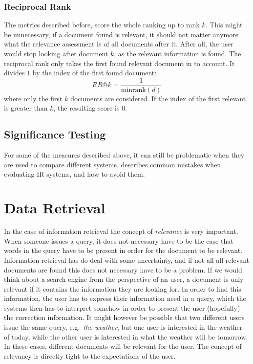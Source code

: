 \subsubsection{Reciprocal Rank} 
The metrics described before, score the whole ranking up to rank $k$. This might be unnecessary, if a document found is relevant, it should not matter anymore what the relevance assessment is of all documents after it. After all, the user would stop looking after document $k$, as the relevant information is found. The reciprocal rank only takes the first found relevant document in to account. It divides $1$ by the index of the first found document:
\begin{equation}
	\textit{RR@k} = \frac{1}{\text{minrank}(d)}
\end{equation}
where only the first $k$ documents are considered. If the index of the first relevant is greater than $k$, the resulting score is $0$.

\subsection{Significance Testing}
For some of the measures described above, it can still be problematic when they are used to compare different systems.  describes common mistakes when evaluating IR systems, and how to avoid them.

\section{Data Retrieval}
In the case of information retrieval the concept of \emph{relevance} is very important. When someone issues a query, it does not necessary have to be the case that words in the query have to be present in order for the document to be relevant. Information retrieval has do deal with some uncertainty, and if not all all relevant documents are found this does not necessary have to be a problem. If we would think about a search engine from the perspective of an user, a document is only relevant if it contains the information they are looking for. In order to find this information, the user has to express their information need in a query, which the systems then has to interpret somehow in order to present the user (hopefully) the correction information. 
It might however be possible that two different users issue the same query, e.g.\ \emph{the weather}, but one user is interested in the weather of today, while the other user is interested in what the weather will be tomorrow. In these cases, different documents will be relevant for the user. The concept of relevancy is directly tight to the expectations of the user.

